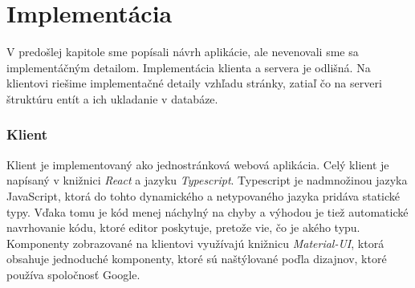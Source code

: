 \chapter{Implementácia}
V predošlej kapitole sme popísali návrh aplikácie, ale nevenovali sme sa implementáčným detailom.
Implementácia klienta a servera je odlišná. Na klientovi riešime implementačné detaily vzhľadu
stránky, zatiaľ čo na serveri štruktúru entít a ich ukladanie v databáze.

\subsection{Klient}
Klient je implementovaný ako jednostránková webová aplikácia. Celý klient je napísaný v knižnici
\textit{React} a jazyku \textit{Typescript}. Typescript je nadmnožinou jazyka JavaScript, ktorá do
tohto dynamického a netypovaného jazyka pridáva statické typy. Vďaka tomu je kód menej náchylný na
chyby a výhodou je tiež automatické navrhovanie kódu, ktoré editor poskytuje, pretože vie, čo je
akého typu. Komponenty zobrazované na klientovi využívajú knižnicu \textit{Material-UI}, ktorá
obsahuje jednoduché komponenty, ktoré sú naštýlované poďla dizajnov, ktoré používa spoločnosť Google.

